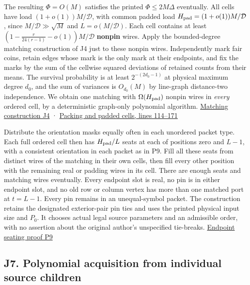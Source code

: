 \documentclass[
  11pt,
]{article}
\begin{document}
The resulting \(\Phi=O(M)\) satisfies the printed \(\Phi\le 2M\Delta\)
eventually. All cells have load \((1+o(1))M/\mathcal D\), with common
padded load \(H_{\rm pad}=(1+o(1))M/\mathcal D\), since
\(M/\mathcal D\gg\sqrt M\) and \(L=o(M/\mathcal D)\). Each cell contains
at least \((1-\frac{r}{24(r-1)}-o(1))M/\mathcal D\) \textbf{nonpin}
wires. Apply the bounded-degree matching construction of J4 just to
these nonpin wires. Independently mark fair coins, retain edges whose
mark is the only mark at their endpoints, and fix the marks by the sum
of the cellwise squared deviations of retained counts from their means.
The survival probability is at least \(2^{-(2d_0-1)}\) at physical
maximum degree \(d_0\), and the sum of variances is \(O_{d_0}(M)\) by
line-graph distance-two independence. We obtain one matching with
\(\Omega(H_{\rm pad})\) nonpin wires in \emph{every} ordered cell, by a
deterministic graph-only polynomial algorithm.
\hyperref[v9-section-joint-algorithms]{Matching construction J4} ·
\href{https://github.com/openai/math/blob/main/preprints/The-Exponential-Time-Hypothesis-is-False-October-25-2026/build/quantitative-contraction.tex\#L114}{Packing
and padded cells, lines 114--171}

Distribute the orientation masks equally often in each unordered packet
type. Each full ordered cell then has \(H_{\rm pad}/L\) seats at each of
positions zero and \(L-1\), with a consistent orientation in each packet
as in P9. Fill all these seats from distinct wires of the matching in
their own cells, then fill every other position with the remaining real
or padding wires in its cell. There are enough seats and matching wires
eventually. Every endpoint slot is real, no pin is in either endpoint
slot, and no old row or column vertex has more than one matched port at
\(t=L-1\). Every pin remains in an unequal-symbol packet. The
construction retains the designated exterior-pair pin ties and uses the
printed physical input size and \(P_0\). It chooses actual legal source
parameters and an admissible order, with no assertion about the original
author's unspecified tie-breaks.
\hyperref[v9-section-precision-frontier]{Endpoint seating proof P9}

\subsection{J7. Polynomial acquisition from individual source
children}\label{v9-j7-polynomial-acquisition-from-individual-source-children}
\end{document}
